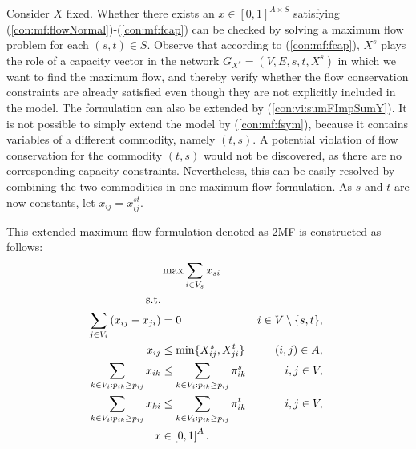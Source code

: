 Consider $X$ fixed.
Whether there exists an $x\in\left[0,1\right]^{A\times S}$ satisfying (\ref{con:mf:flowNormal})-(\ref{con:mf:fcap}) can be checked by solving a maximum flow problem for each $(s,t)\in S$.
Observe that according to (\ref{con:mf:fcap}), $X^s$ plays the role of a capacity vector in the network $G_{X^s}=(V,E,s,t,X^s)$ in which we want to find the maximum flow, and thereby verify whether the flow conservation constraints are already satisfied even though they are not explicitly included in the model.
The formulation can also be extended by (\ref{con:vi:sumFImpSumY}).
It is not possible to simply extend the model by (\ref{con:mf:fsym}), because it contains variables of a different commodity, namely $(t,s)$.
A potential violation of flow conservation for the commodity $(t,s)$ would not be discovered, as there are no corresponding capacity constraints.
Nevertheless, this can be easily resolved by combining the two commodities in one maximum flow formulation.
As $s$ and $t$ are now constants, let $x_{ij}=x^{st}_{ij}$.

This extended maximum flow formulation denoted as 2MF is constructed as follows:
\newline
\newline  
\begin{subequations}\label{eq:mf}
\begin{align}
\label{objective:maxf} &\max\sum\limits_{i \in V_s} x_{si} \\ 
\text{s.t.}  \notag   \\
\label{con:maxf:flowNormal}  \sum\limits_{\substack{ j\in V_i}}\left(x_{ij}-x_{ji}\right) & = 0 & i\in V\setminus\{s,t\},\\
\label{con:maxf:fcapst}   x_{ij} &\leq \min\{X_{ij}^s, X_{ji}^t\}     &  (i,j)\in A,  \\ 	 
\label{con:maxf:sumFImpSumYst} \sum\limits_{k\in V_i:p_{ik}\geq p_{ij}}x_{ik} & \leq \sum\limits_{k\in V_i:p_{ik}\geq p_{ij}}  \pi^{s}_{ik} & i,j\in V,\\
\label{con:maxf:sumFImpSumYts} \sum\limits_{k\in V_i:p_{ik}\geq p_{ij}}x_{ki} & \leq \sum\limits_{k\in V_i:p_{ik}\geq p_{ij}}  \pi^{t}_{ik} &  i,j\in V,\\
\label{con:maxf:fdim}x&\in\left[0,1\right]^{A}. 
\end{align}~
\end{subequations}  
  
